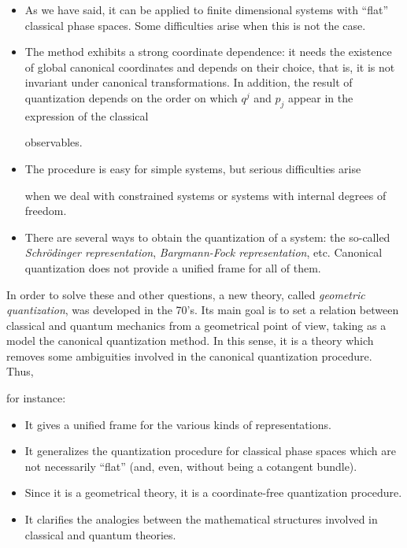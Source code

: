 \documentclass[12pt]{article}
\theoremstyle{plain}
\begin{document}
\begin{itemize}
\item
As we have said, it can be applied to finite dimensional systems
with ``flat'' classical phase spaces. Some difficulties arise when this
is not the case.
\item
The method exhibits a strong coordinate dependence:
it needs the existence of global canonical coordinates and depends on
their choice,
that is, it is not invariant under canonical transformations.
In addition, the result of quantization depends on the
order on which $q^j$ and $p_j$ appear in the expression of the classical

observables.
\item
The procedure is easy for simple systems, but serious difficulties arise

when we deal with
constrained systems or systems with internal degrees of freedom.
\item
There are several ways to obtain the quantization of a system: the
so-called
{\it Schr\"odinger representation}, {\it Bargmann-Fock representation},
etc. Canonical quantization does not provide a unified frame for all of
them.
\end{itemize}

In order to solve these and other questions,
a new theory, called {\it geometric quantization}, was developed in the
70's.
Its main goal is to set a relation between
classical and quantum mechanics from a geometrical point of view,
taking as a model the canonical quantization method.
In this sense, it is a theory which removes
some ambiguities involved in the canonical quantization procedure. Thus,

for instance:
\begin{itemize}
\item
It gives a unified frame for the various kinds of representations.
\item
It generalizes the quantization procedure for classical
phase spaces which are not necessarily ``flat''
(and, even, without being a cotangent bundle).
\item
Since it is a geometrical theory, it is a coordinate-free quantization
procedure.
\item
It clarifies the analogies between the mathematical
structures involved in classical and quantum theories.
\end{itemize}
\end{document}
